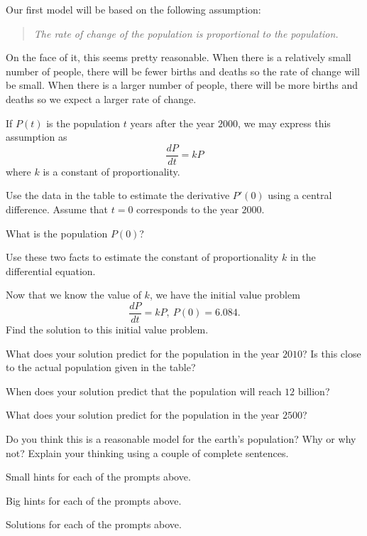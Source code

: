 \begin{activity} \label{A:7.6.1}  
  Our first model will be based on the following assumption:
  \begin{quote}{\em
      The rate of change of the population is proportional to the
      population.  
    }
  \end{quote}

  On the face of it, this seems pretty reasonable.  When there is a
  relatively small number of people, there will be fewer births and
  deaths so the rate of change will be small.  When there is a larger
  number of people, there will be more births and deaths so we expect
  a larger rate of change.

  If $P(t)$ is the population $t$ years after the year $2000$, we may
  express this assumption as
  $$
  \frac{dP}{dt} = kP
  $$
  where $k$ is a constant of proportionality.

\ba
\item Use the data in the table to estimate the derivative $P'(0)$
  using a central difference.  Assume that $t=0$ corresponds to the
  year $2000$.

\item What is the population $P(0)$?

\item Use these two facts to estimate the constant of proportionality
  $k$ in the differential equation.

\item Now that we know the value of $k$, we have the initial
  value problem
  $$
    \frac{dP}{dt} = kP, \ P(0) = 6.084.
  $$
  Find the solution to this initial value problem.

\item What does your solution predict for the population in the year
  $2010$?  Is this close to the actual population given in the table?

\item When does your solution predict that the population will reach
  $12$ billion?

\item What does your solution predict for the population in the year
  $2500$? 

\item Do you think this is a reasonable model for the earth's
  population?  Why or why not?  Explain your thinking using a couple
  of complete sentences. 

\ea
\end{activity}
\begin{smallhint}
\ba
	\item Small hints for each of the prompts above.
\ea
\end{smallhint}
\begin{bighint}
\ba
	\item Big hints for each of the prompts above.
\ea
\end{bighint}
\begin{activitySolution}
\ba
	\item Solutions for each of the prompts above.
\ea
\end{activitySolution}
\aftera